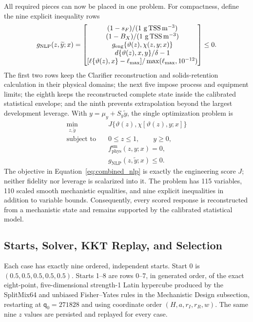 \documentclass[a4paper,fleqn]{cas-sc}
\begin{document}
All required pieces can now be placed in one problem. For compactness, define the nine explicit inequality rows
\begin{equation}
\label{eq:combined_inequalities}
g_{\mathrm{NLP}}(z,\widetilde y;x)=
\begin{bmatrix}
(1-s_F)/(1\ {\rm g\,TSS\,m^{-3}})\\
(1-B_X)/(1\ {\rm g\,TSS\,m^{-3}})\\
g_{\mathrm{eng}}\{\vartheta(z),\chi(z,y;x)\}\\
d\{\vartheta(z),x,y\}/\delta-1\\
[\ell\{\vartheta(z),x\}-\ell_{\max}]/\max(\ell_{\max},10^{-12})
\end{bmatrix}\leq0.
\end{equation}
The first two rows keep the Clarifier reconstruction and solids-retention calculation in their physical domains; the next five impose process and equipment limits; the eighth keeps the reconstructed complete state inside the calibrated statistical envelope; and the ninth prevents extrapolation beyond the largest development leverage. With $y=\mu_y+S_y\widetilde y$, the single optimization problem is
\begin{equation}
\label{eq:combined_nlp}
\begin{aligned}
\min_{z,\widetilde y}\quad&J\{\vartheta(z),\chi[\vartheta(z),y;x]\}\\
\text{subject to}\quad&
0\leq z\leq1,\qquad y\geq0,\\
&f_{\mathrm{phys}}^{\mathrm{sm}}(z,y;x)=0,\\
&g_{\mathrm{NLP}}(z,\widetilde y;x)\leq0.
\end{aligned}
\end{equation}
The objective in Equation~\eqref{eq:combined_nlp} is exactly the engineering score $J$; neither fidelity nor leverage is scalarized into it. The problem has 115 variables, 110 scaled smooth mechanistic equalities, and nine explicit inequalities in addition to variable bounds. Consequently, every scored response is reconstructed from a mechanistic state and remains supported by the calibrated statistical model.

\subsection{Starts, Solver, KKT Replay, and Selection}

Each case has exactly nine ordered, independent starts. Start 0 is $(0.5,0.5,0.5,0.5,0.5)$. Starts 1--8 are rows 0--7, in generated order, of the exact eight-point, five-dimensional strength-1 Latin hypercube produced by the SplitMix64 and unbiased Fisher--Yates rules in the Mechanistic Design subsection, restarting at $\mathsf q_0=271828$ and using coordinate order $(H,a,r_I,r_R,w)$. The same nine $z$ values are persisted and replayed for every case.
\end{document}
